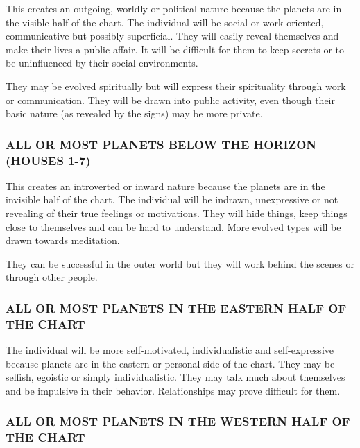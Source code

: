  

This creates an outgoing, worldly or political nature because the planets are in the visible half of the chart. The individual will be social or work oriented, communicative but possibly superficial. They will easily reveal themselves and make their lives a public affair. It will be difficult for them to keep secrets or to be uninfluenced by their social environments.

They may be evolved spiritually but will express their spirituality through work or communication. They will be drawn into public activity, even though their basic nature (as revealed by the signs) may be more private.

 

\subsubsection{ALL OR MOST PLANETS BELOW THE HORIZON (HOUSES 1-7)}

 

This creates an introverted or inward nature because the planets are in the invisible half of the chart. The individual will be indrawn, unexpressive or not revealing of their true feelings or motivations. They will hide things, keep things close to themselves and can be hard to understand. More evolved types will be drawn towards meditation.

They can be successful in the outer world but they will work behind the scenes or through other people.

 

\subsubsection{ALL OR MOST PLANETS IN THE EASTERN HALF OF THE CHART}

 

The individual will be more self-motivated, individualistic and self-expressive because planets are in the eastern or personal side of the chart. They may be selfish, egoistic or simply individualistic. They may talk much about themselves and be impulsive in their behavior. Relationships may prove difficult for them.

 

\subsubsection{ALL OR MOST PLANETS IN THE WESTERN HALF OF THE CHART}

